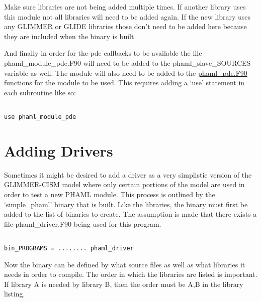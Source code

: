 Make sure libraries are not being added multiple times.  If another library uses this module not all libraries will need to be added again.  If the new library uses any GLIMMER or GLIDE libraries those don't need to be added here because they are included when the binary is built.


And finally in order for the pde callbacks to be available the file phaml\_module\_pde.F90 will need to be added to the phaml\_slave\_SOURCES variable as well.  The module will also need to be added to the \href{http://svn.berlios.de/svnroot/repos/glimmer-cism/glimmer-cism2/libphaml/phaml\_pde.F90}{phaml\_pde.F90}
 functions for the module to be used.  This requires adding a `use' statement in each subroutine like so: 

\begin{framecode}{6in}
\begin{verbatim}

use phaml_module_pde

\end{verbatim}
\end{framecode}

\section{Adding Drivers}\label{sec:adddrive}

Sometimes it might be desired to add a driver as a very simplistic version of the GLIMMER-CISM model where only certain portions of the model are used in order to test a new PHAML module.  This process is outlined by the `simple\_phaml' binary that is built.  Like the libraries, the binary must first be added to the list of binaries to create.  The assumption is made that there exists a file phaml\_driver.F90 being used for this program.

\begin{framecode}{6in}
\begin{verbatim}

bin_PROGRAMS = ........ phaml_driver

\end{verbatim}
\end{framecode}

Now the binary can be defined by what source files as well as what libraries it needs in order to compile.  The order in which the libraries are listed is important.  If library A is needed by library B, then the order must be A,B in the library listing.

